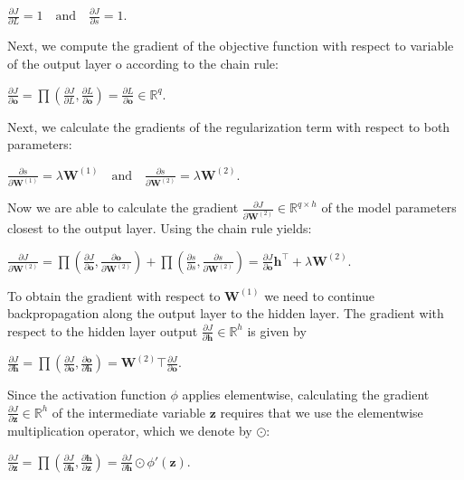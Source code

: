 \documentclass[11pt]{article}
\begin{document}
\(\frac{\partial J}{\partial L} = 1 \quad \text{and} \quad \frac{\partial J}{\partial s} = 1\).

Next, we compute the gradient of the objective function with respect to
variable of the output layer o according to the chain rule:

\(\frac{\partial J}{\partial \mathbf{o}} = \prod \left( \frac{\partial J}{\partial L}, \frac{\partial L}{\partial \mathbf{o}} \right) = \frac{\partial L}{\partial \mathbf{o}} \in \mathbb{R}^{q}\).

Next, we calculate the gradients of the regularization term with respect
to both parameters:

\(\frac{\partial s}{\partial \mathbf{W}^{(1)}} = \lambda \mathbf{W}^{(1)} \quad \text{and} \quad \frac{\partial s}{\partial \mathbf{W}^{(2)}} = \lambda \mathbf{W}^{(2)}\).

Now we are able to calculate the gradient
\(\frac{\partial J}{\partial \mathbf{W}^{(2)}} \in \mathbb{R}^{q \times h}\)
of the model parameters closest to the output layer. Using the chain
rule yields:

\(\frac{\partial J}{\partial \mathbf{W}^{(2)}} = \prod \left( \frac{\partial J}{\partial \mathbf{o}}, \frac{\partial \mathbf{o}}{\partial \mathbf{W}^{(2)}} \right) + \prod \left( \frac{\partial s}{\partial s}, \frac{\partial s}{\partial \mathbf{W}^{(2)}} \right) = \frac{\partial J}{\partial \mathbf{o}} \mathbf{h}^{\top} + \lambda \mathbf{W}^{(2)}\).

To obtain the gradient with respect to \(\mathbf{W}^{(1)}\) we need to
continue backpropagation along the output layer to the hidden layer. The
gradient with respect to the hidden layer output
\(\frac{\partial J}{\partial \mathbf{h}} \in \mathbb{R}^{h}\) is given
by

\(\frac{\partial J}{\partial \mathbf{h}} = \prod \left( \frac{\partial J}{\partial \mathbf{o}}, \frac{\partial \mathbf{o}}{\partial \mathbf{h}} \right) = \mathbf{W}^{(2)} \top \frac{\partial J}{\partial \mathbf{o}}\).

Since the activation function \(\phi\) applies elementwise, calculating
the gradient
\(\frac{\partial J}{\partial \mathbf{z}} \in \mathbb{R}^{h}\) of the
intermediate variable \(\mathbf{z}\) requires that we use the
elementwise multiplication operator, which we denote by \(\odot\):

\(\frac{\partial J}{\partial \mathbf{z}} = \prod \left( \frac{\partial J}{\partial \mathbf{h}}, \frac{\partial \mathbf{h}}{\partial \mathbf{z}} \right) = \frac{\partial J}{\partial \mathbf{h}} \odot \phi{\prime}(\mathbf{z})\).
\end{document}
